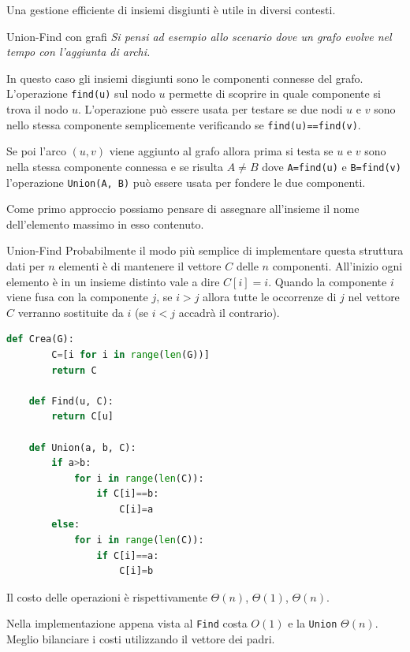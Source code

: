 Una gestione efficiente di insiemi disgiunti è utile in diversi contesti. 

\begin{Example}{Union-Find con grafi}{}
    \textit{Si pensi ad esempio allo scenario dove un grafo evolve nel tempo con l’aggiunta di archi.} 
    
    In questo caso gli insiemi disgiunti sono le componenti connesse del grafo. L’operazione \verb|find(u)| sul nodo $u$ permette di scoprire in quale componente si trova il nodo $u$. L’operazione può essere usata per testare se due nodi $u$ e $v$ sono nello stessa componente semplicemente verificando se \verb|find(u)==find(v)|.

    Se poi l’arco $(u,v)$ viene aggiunto al grafo allora prima si testa se $u$ e $v$ sono nella stessa componente connessa e se risulta $A\neq B$ dove \verb|A=find(u)| e \verb|B=find(v)| l’operazione \verb|Union(A, B)| può essere usata per fondere le due componenti.
\end{Example}

Come primo approccio possiamo pensare di assegnare all’insieme il nome dell’elemento massimo in esso contenuto.

\begin{Algoritmo}{Union-Find}{}
    Probabilmente il modo più semplice di implementare questa struttura dati per $n$ elementi è di mantenere il vettore $C$ delle $n$ componenti. All’inizio ogni elemento è in un insieme distinto vale a dire $C[i]=i$. Quando la componente $i$ viene fusa con la componente $j$, se $i>j$ allora tutte le occorrenze di $j$ nel vettore $C$ verranno sostituite da $i$ (se $i<j$ accadrà il contrario).

    \begin{lstlisting}[language=Python]
    def Crea(G):
        C=[i for i in range(len(G))]
        return C

    def Find(u, C):
        return C[u]

    def Union(a, b, C):
        if a>b:
            for i in range(len(C)):
                if C[i]==b:
                    C[i]=a
        else:
            for i in range(len(C)):
                if C[i]==a:
                    C[i]=b
    \end{lstlisting}

    Il costo delle operazioni è rispettivamente $\Theta(n)$, $\Theta(1)$, $\Theta(n)$.
\end{Algoritmo}

Nella implementazione appena vista al \verb|Find| costa $O(1)$ e la \verb|Union| $\Theta(n)$. Meglio bilanciare i costi utilizzando il vettore dei padri.


